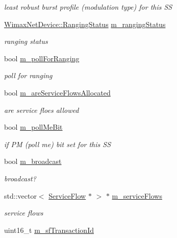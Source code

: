 \begin{DoxyCompactItemize}
\begin{DoxyCompactList}\small\item\em least robust burst profile (modulation type) for this SS \end{DoxyCompactList}\item 
\hyperlink{classns3_1_1WimaxNetDevice_a2a74c0f01e51abc1851a630242e7b591}{Wimax\+Net\+Device\+::\+Ranging\+Status} \hyperlink{classns3_1_1SSRecord_a0d544f144c5265eb922c6a92c0b93f87}{m\+\_\+ranging\+Status}
\begin{DoxyCompactList}\small\item\em ranging status \end{DoxyCompactList}\item 
bool \hyperlink{classns3_1_1SSRecord_a83ea79b98a2e1b31399e3bdb9f85c3e6}{m\+\_\+poll\+For\+Ranging}
\begin{DoxyCompactList}\small\item\em poll for ranging \end{DoxyCompactList}\item 
bool \hyperlink{classns3_1_1SSRecord_acce2b535665547c8443fcb1c366041bb}{m\+\_\+are\+Service\+Flows\+Allocated}
\begin{DoxyCompactList}\small\item\em are service floes allowed \end{DoxyCompactList}\item 
bool \hyperlink{classns3_1_1SSRecord_a96aeaab56a5c343a383e9e846c8790b2}{m\+\_\+poll\+Me\+Bit}
\begin{DoxyCompactList}\small\item\em if PM (poll me) bit set for this SS \end{DoxyCompactList}\item 
bool \hyperlink{classns3_1_1SSRecord_a8d4ce51fb7f00a3fc20fe07c2a3ff689}{m\+\_\+broadcast}
\begin{DoxyCompactList}\small\item\em broadcast? \end{DoxyCompactList}\item 
std\+::vector$<$ \hyperlink{classns3_1_1ServiceFlow}{Service\+Flow} $\ast$ $>$ $\ast$ \hyperlink{classns3_1_1SSRecord_a8bff04f40a04179469fcdbf4560d12b3}{m\+\_\+service\+Flows}
\begin{DoxyCompactList}\small\item\em service flows \end{DoxyCompactList}\item 
uint16\+\_\+t \hyperlink{classns3_1_1SSRecord_ae0fc6dfc404423bacb407dcfb806a5e3}{m\+\_\+sf\+Transaction\+Id}

\end{DoxyCompactItemize}
